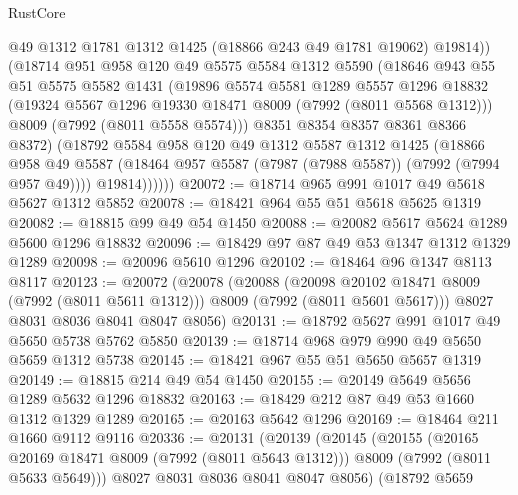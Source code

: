 \begin{lexlean}{RustCore}
\begin{coremodule}
                @49
                @1312
                @1781
                @1312
                @1425
                (@18866 @243 @49 @1781 @19062)
                @19814))
            (@18714
              @951
              @958
              @120
              @49
              @5575
              @5584
              @1312
              @5590
              (@18646
                @943
                @55
                @51
                @5575
                @5582
                @1431
                (@19896
                  @5574
                  @5581
                  @1289
                  @5557
                  @1296
                  @18832
                  (@19324 @5567 @1296 @19330 @18471 @8009 (@7992 (@8011 @5568 @1312)))
                  @8009
                  (@7992 (@8011 @5558 @5574)))
                @8351
                @8354
                @8357
                @8361
                @8366
                @8372)
              (@18792
                @5584
                @958
                @120
                @49
                @1312
                @5587
                @1312
                @1425
                (@18866
                  @958
                  @49
                  @5587
                  (@18464 @957 @5587 (@7987 (@7988 @5587)) (@7992 (@7994 @957 @49))))
                @19814))))))
@20072 := @18714 @965 @991 @1017 @49 @5618 @5627 @1312 @5852
@20078 := @18421 @964 @55 @51 @5618 @5625 @1319
@20082 := @18815 @99 @49 @54 @1450
@20088 := @20082 @5617 @5624 @1289 @5600 @1296 @18832
@20096 := @18429 @97 @87 @49 @53 @1347 @1312 @1329 @1289
@20098 := @20096 @5610 @1296
@20102 := @18464 @96 @1347 @8113 @8117
@20123 := @20072
    (@20078
      (@20088
        (@20098 @20102 @18471 @8009 (@7992 (@8011 @5611 @1312)))
        @8009
        (@7992 (@8011 @5601 @5617)))
      @8027
      @8031
      @8036
      @8041
      @8047
      @8056)
@20131 := @18792 @5627 @991 @1017 @49 @5650 @5738 @5762 @5850
@20139 := @18714 @968 @979 @990 @49 @5650 @5659 @1312 @5738
@20145 := @18421 @967 @55 @51 @5650 @5657 @1319
@20149 := @18815 @214 @49 @54 @1450
@20155 := @20149 @5649 @5656 @1289 @5632 @1296 @18832
@20163 := @18429 @212 @87 @49 @53 @1660 @1312 @1329 @1289
@20165 := @20163 @5642 @1296
@20169 := @18464 @211 @1660 @9112 @9116
@20336 := @20131
    (@20139
      (@20145
        (@20155
          (@20165 @20169 @18471 @8009 (@7992 (@8011 @5643 @1312)))
          @8009
          (@7992 (@8011 @5633 @5649)))
        @8027
        @8031
        @8036
        @8041
        @8047
        @8056)
      (@18792
        @5659

\end{coremodule}
\end{lexlean}
